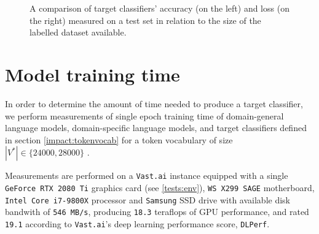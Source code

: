 \begin{figure}
\centering
\caption{A comparison of target classifiers' accuracy (on the left) and loss (on the right) measured on a test set in relation to the size of the labelled dataset available.}
\label{dataamount:resultsplot}
\end{figure}

\section{Model training time}

In order to determine the amount of time needed to produce a target classifier, we perform measurements of single epoch training time of domain-general language models, domain-specific language models, and target classifiers defined in section \ref{impact:tokenvocab} for a token vocabulary of size $|V^*| \in \{24000, 28000\}$ .

Measurements are performed on a \lstinline{Vast.ai} instance equipped with a single \lstinline{GeForce RTX 2080 Ti} graphics card (see \ref{tests:env}), \lstinline{WS X299 SAGE} motherboard, \lstinline{Intel Core i7-9800X} processor and \lstinline{Samsung} SSD drive with available disk bandwith of \lstinline{546 MB/s}, producing \lstinline{18.3} teraflops of GPU performance, and rated \lstinline{19.1} according to \lstinline{Vast.ai}'s deep learning performance score, \lstinline{DLPerf}.

